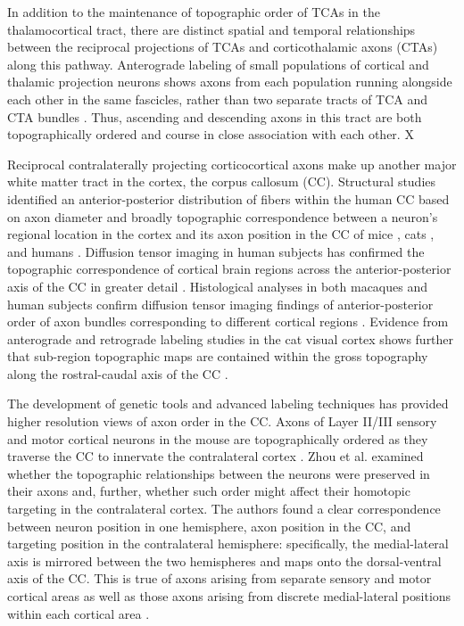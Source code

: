 In addition to the maintenance of topographic order of TCAs in the thalamocortical tract, there are distinct spatial and temporal relationships between the reciprocal projections of TCAs and corticothalamic axons (CTAs) along this pathway. 
Anterograde labeling of small populations of cortical and thalamic projection neurons shows axons from each population running alongside each other in the same fascicles, rather than two separate tracts of TCA and CTA bundles \cite{molnar1998mechanisms}. 
Thus, ascending and descending axons in this tract are both topographically ordered and course in close association with each other. 
X

Reciprocal contralaterally projecting corticocortical axons make up another major white matter tract in the cortex, the corpus callosum (CC). 
Structural studies identified an anterior-posterior distribution of fibers within the human CC based on axon diameter \cite{aboitiz1992fiber} and broadly topographic correspondence between a neuron’s regional location in the cortex and its axon position in the CC of mice \cite{ozaki1992prenatal}, cats \cite{nakamura1989topography}, and humans \cite{de1985topography}. 
Diffusion tensor imaging in human subjects has confirmed the topographic correspondence of cortical brain regions across the anterior-posterior axis of the CC in greater detail \cite{hofer2006topography}. 
Histological analyses in both macaques and human subjects confirm diffusion tensor imaging findings of anterior-posterior order of axon bundles corresponding to different cortical regions \cite{caminiti2013diameter}.
Evidence from anterograde and retrograde labeling studies in the cat visual cortex shows further that sub-region topographic maps are contained within the gross topography along the rostral-caudal axis of the CC \cite{payne1991visual}. 

The development of genetic tools and advanced labeling techniques has provided higher resolution views of axon order in the CC. 
Axons of Layer II/III sensory and motor cortical neurons in the mouse are topographically ordered as they traverse the CC to innervate the contralateral cortex \cite{zhou2013axon}. 
Zhou et al. examined whether the topographic relationships between the neurons were preserved in their axons and, further, whether such order might affect their homotopic targeting in the contralateral cortex. 
The authors found a clear correspondence between neuron position in one hemisphere, axon position in the CC, and targeting position in the contralateral hemisphere: specifically, the medial-lateral axis is mirrored between the two hemispheres and maps onto the dorsal-ventral axis of the CC. 
This is true of axons arising from separate sensory and motor cortical areas as well as those axons arising from discrete medial-lateral positions within each cortical area \cite{zhou2013axon}. 

